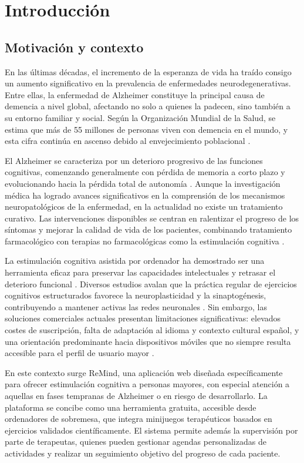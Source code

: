 \chapter{Introducción}
\section{Motivación y contexto}
En las últimas décadas, el incremento de la esperanza de vida ha traído consigo un aumento significativo en la prevalencia de enfermedades neurodegenerativas. Entre ellas, la enfermedad de Alzheimer constituye la principal causa de demencia a nivel global, afectando no solo a quienes la padecen, sino también a su entorno familiar y social. Según la Organización Mundial de la Salud, se estima que más de 55 millones de personas viven con demencia en el mundo, y esta cifra continúa en ascenso debido al envejecimiento poblacional \cite{who2021dementia}.

El Alzheimer se caracteriza por un deterioro progresivo de las funciones cognitivas, comenzando generalmente con pérdida de memoria a corto plazo y evolucionando hacia la pérdida total de autonomía \cite{merino2015enfermedad}. Aunque la investigación médica ha logrado avances significativos en la comprensión de los mecanismos neuropatológicos de la enfermedad, en la actualidad no existe un tratamiento curativo. Las intervenciones disponibles se centran en ralentizar el progreso de los síntomas y mejorar la calidad de vida de los pacientes, combinando tratamiento farmacológico con terapias no farmacológicas como la estimulación cognitiva \cite{merino2015enfermedad}.

La estimulación cognitiva asistida por ordenador ha demostrado ser una herramienta eficaz para preservar las capacidades intelectuales y retrasar el deterioro funcional \cite{kueider2012computerized}. Diversos estudios avalan que la práctica regular de ejercicios cognitivos estructurados favorece la neuroplasticidad y la sinaptogénesis, contribuyendo a mantener activas las redes neuronales \cite{castillo2020neuroplasticidad}. Sin embargo, las soluciones comerciales actuales presentan limitaciones significativas: elevados costes de suscripción, falta de adaptación al idioma y contexto cultural español, y una orientación predominante hacia dispositivos móviles que no siempre resulta accesible para el perfil de usuario mayor \cite{dort2020_aphasia, stroke_equity_2021}.

En este contexto surge ReMind, una aplicación web diseñada específicamente para ofrecer estimulación cognitiva a personas mayores, con especial atención a aquellas en fases tempranas de Alzheimer o en riesgo de desarrollarlo. La plataforma se concibe como una herramienta gratuita, accesible desde ordenadores de sobremesa, que integra minijuegos terapéuticos basados en ejercicios validados científicamente. El sistema permite además la supervisión por parte de terapeutas, quienes pueden gestionar agendas personalizadas de actividades y realizar un seguimiento objetivo del progreso de cada paciente.

